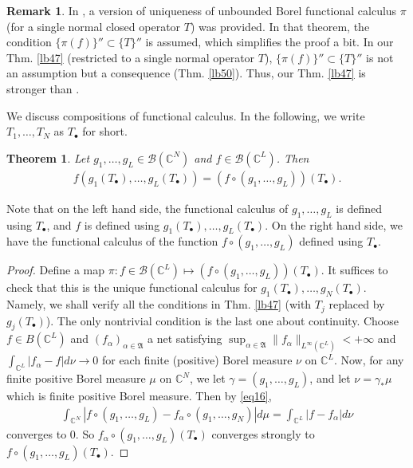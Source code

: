 \documentclass[12pt,a4paper,notitlepage]{article}
\theoremstyle{definition}
\newtheorem{rem}[df]{Remark}
\theoremstyle{plain}
\newtheorem{thm}[df]{Theorem}
\newcommand{\fk}{\mathfrak}
\newcommand{\scr}{\mathscr}
\newcommand{\blt}{\bullet}
\newcommand{\Cbb}{\mathbb C}
\numberwithin{equation}{section}
\begin{document}
\begin{rem}
In \cite[Thm. 5.6.27]{Kad}, a version of uniqueness of unbounded Borel functional calculus $\pi$ (for a single normal closed operator $T$) was  provided. In that theorem, the condition $\{\pi(f)\}''\subset\{T\}''$ is assumed, which simplifies the proof a bit. In our Thm. \ref{lb47} (restricted to a single normal operator $T$), $\{\pi(f)\}''\subset\{T\}''$ is not an assumption but a consequence (Thm. \ref{lb50}). Thus, our Thm. \ref{lb47} is stronger than \cite[Thm. 5.6.27]{Kad}.
\end{rem}


We discuss compositions of functional calculus. In the following, we write $T_1,\dots,T_N$ as $T_\blt$ for short.

\begin{thm}\label{lb48}
Let $g_1,\dots,g_L\in \scr B(\Cbb^N)$ and $f\in\scr B(\Cbb^L)$. Then
\begin{align}
f(g_1(T_\blt),\dots,g_L(T_\blt))=(f\circ(g_1,\dots,g_L))(T_\blt).\end{align}
\end{thm}

Note that on the left hand side, the functional calculus of $g_1,\dots,g_L$ is defined using $T_\blt$, and $f$ is defined using $g_1(T_\blt),\dots,g_L(T_\blt)$. On the right hand side, we have the functional calculus of the function $f\circ(g_1,\dots,g_L)$ defined using $T_\blt$.


\begin{proof}
Define a map $\pi:f\in\scr B(\Cbb^L)\mapsto (f\circ(g_1,\dots,g_L))(T_\blt)$. It suffices to check that this is the unique functional calculus for $g_1(T_\blt),\dots,g_N(T_\blt)$. Namely, we shall verify all the conditions in Thm. \ref{lb47} (with $T_j$ replaced by $g_j(T_\blt)$). The only nontrivial condition is the last one about continuity. Choose $f\in B(\Cbb^L)$ and $(f_\alpha)_{\alpha\in\fk A}$ a net satisfying  $\sup_{\alpha\in\fk A}\lVert f_\alpha\lVert_{L^\infty(\Cbb^L)}<+\infty$ and $\int_{\Cbb^L}|f_\alpha-f|d\nu\rightarrow 0$ for each finite (positive) Borel measure $\nu$ on $\Cbb^L$. Now, for any finite positive Borel measure $\mu$ on $\Cbb^N$, we let $\gamma=(g_1,\dots,g_L)$, and let $\nu=\gamma_*\mu$ which is finite positive Borel measure. Then by \eqref{eq16},
\begin{align*}
\int_{\Cbb^N}|f\circ(g_1,\dots,g_L)-f_\alpha\circ (g_1,\dots,g_N)|d\mu=\int_{\Cbb^L}|f-f_\alpha|d\nu
\end{align*}
converges to $0$. So $f_\alpha\circ(g_1,\dots,g_L)(T_\blt)$ converges strongly to $f\circ(g_1,\dots,g_L)(T_\blt)$.
\end{proof}
\end{document}
